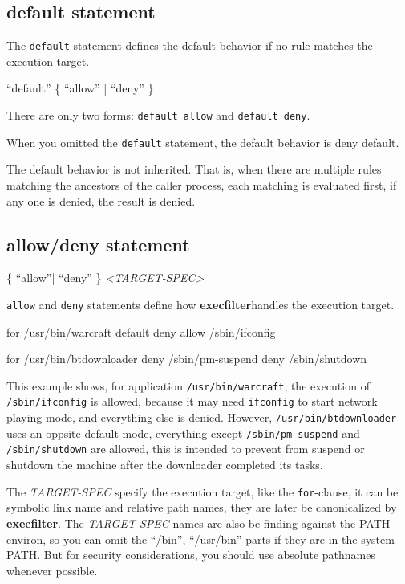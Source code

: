 \documentclass[hyperref, bookmark]{z-article}
\newcommand\code[1]{\texttt{#1}}
\newcommand\syntax[1]{
  \begin{mdframed}[
      linecolor=brown,
      linewidth=2pt,
    ]
    #1
  \end{mdframed}
}
\newcommand\xfilt{\textbf{execfilter}}
\begin{document}
\subsection {default statement}

The \code{default} statement defines the default behavior if no rule matches the
execution target.

\syntax {
  ``default'' \{ ``allow'' | ``deny'' \}
}

There are only two forms: \code{default allow} and \code{default deny}.

When you omitted the \code{default} statement, the default behavior is deny
default.

The default behavior is not inherited. That is, when there are multiple rules
matching the ancestors of the caller process, each matching is evaluated first,
if any one is denied, the result is denied.

\subsection {allow/deny statement}

\syntax {
  \{ ``allow''| ``deny'' \} \textit{<TARGET-SPEC>}
}

\code{allow} and \code{deny} statements define how \xfilt handles the execution target.

\begin{codeblk}
  for /usr/bin/warcraft
    default deny
    allow /sbin/ifconfig

  for /usr/bin/btdownloader
    deny /sbin/pm-suspend
    deny /sbin/shutdown
\end{codeblk}

This example shows, for application \code{/usr/bin/warcraft}, the execution of
\code{/sbin/ifconfig} is allowed, because it may need \code{ifconfig} to start
network playing mode, and everything else is denied.  However,
\code{/usr/bin/btdownloader} uses an oppsite default mode, everything except
\code{/sbin/pm-suspend} and \code{/sbin/shutdown} are allowed, this is intended
to prevent from suspend or shutdown the machine after the downloader completed
its tasks.

The \textit{TARGET-SPEC} specify the execution target, like the
\code{for}-clause, it can be symbolic link name and relative path names, they
are later be canonicalized by \xfilt. The \textit{TARGET-SPEC} names are also be
finding against the PATH environ, so you can omit the ``/bin'', ``/usr/bin''
parts if they are in the system PATH.  But for security considerations, you
should use absolute pathnames whenever possible.
\end{document}
